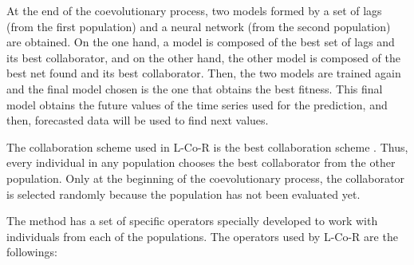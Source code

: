 \documentclass[a4paper,twoside]{article}
\newcommand{\metodo}{L-Co-R}
\begin{document}
At the end of the coevolutionary process, two models formed by a set of lags (from the first population) and a neural network (from the second population) are obtained. On the one hand, a model is composed of the best set of lags and its best collaborator, and on the other hand, the other model is composed of the best net found and its best collaborator. Then, the two models are trained again and the final model chosen is the one that obtains the best fitness. This final model obtains the future values of the time series used for the prediction, and then, forecasted data will be used to find next values.

The collaboration scheme used in {\metodo} is the best collaboration scheme \cite{Potter94}. %
Thus, every individual in any population chooses the best collaborator from the other population. Only at the beginning of the coevolutionary process, the collaborator is selected randomly because the population has not been evaluated yet.

%


The method has a set of specific operators specially developed to work with individuals from each of the populations. %
The operators used by {\metodo} are the followings:
\end{document}
